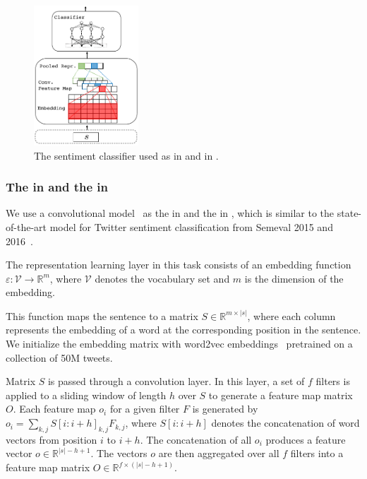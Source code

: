 \begin{figure}[t]
    \centering
            \includegraphics[width=0.35\textwidth]{03-part-02/chapter-05/figs_and_tables/fig_sentiment.pdf}
    \caption{The sentiment classifier used as \tch in \cws and \std in \fwl.}
    \label{fig:sentiment}
\end{figure}


\subsubsection{The \tnet in \cws and the \std in \fwl}
We use a convolutional model~\citep{Kim:2014} as the \tnet in \cws and the \std in \fwl, which is similar to the state-of-the-art model for Twitter sentiment classification from Semeval 2015 and 2016~\citep{Severyn:2015:SemEval,Deriu2016:SemEval,Deriu:2017,Severyn:2015:SIGIR}.

The representation learning layer in this task consists of an embedding function $\varepsilon: \mathcal{V} \rightarrow \mathbb{R}^{m}$, where $\mathcal{V}$ denotes the vocabulary set and $m$ is the dimension of the embedding.

This function maps the sentence to a matrix $S \in \mathbb{R}^{m \times |s|}$, where each column represents the embedding of a word at the corresponding position in the sentence. We initialize the embedding matrix with word2vec embeddings~\citep{Mikolov:2013} pretrained on a collection of 50M tweets.

Matrix $S$ is passed through a convolution layer.  In this layer, a set of $f$ filters is applied to a sliding window of length $h$ over $S$ to generate a feature map matrix $O$. Each feature map $o_i$ for a given filter $F$ is generated by $o_i = \sum_{k,j}S[i:i+h]_{k,j} F_{k,j}$, where $S[i:i+h]$ denotes the concatenation of word vectors from position $i$ to $i+h$. The concatenation of all $o_i$ produces a feature vector $o \in \mathbb{R}^{|s|-h+1}$. The vectors $o$ are then aggregated over all $f$ filters into a feature map matrix $O \in \mathbb{R}^{f\times(|s|-h+1)}$.

